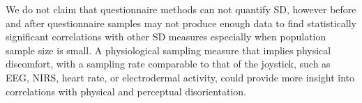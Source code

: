\documentclass{ieeeaccess}
\begin{document}
We do not claim that questionnaire methods can not quantify SD, however before and after questionnaire samples may not produce enough data to find statistically significant correlations with other SD measures especially when population sample size is small. A physiological sampling measure that implies physical discomfort, with a sampling rate comparable to that of the joystick, such as EEG, NIRS, heart rate, or electrodermal activity, could provide more insight into correlations with physical and perceptual disorientation.











\end{document}
